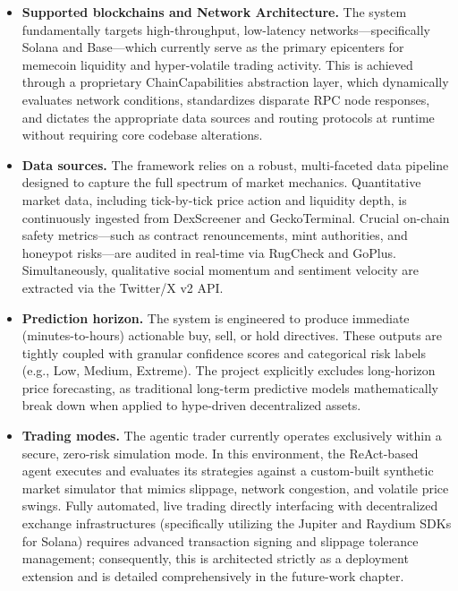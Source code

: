 \documentclass[12pt,a4paper,oneside,openany]{book}
\begin{document}
\begin{itemize}[leftmargin=8mm]
\item \textbf{Supported blockchains and Network Architecture.} The system fundamentally targets high-throughput, low-latency networks—specifically Solana and Base—which currently serve as the primary epicenters for memecoin liquidity and hyper-volatile trading activity. This is achieved through a proprietary ChainCapabilities abstraction layer, which dynamically evaluates network conditions, standardizes disparate RPC node responses, and dictates the appropriate data sources and routing protocols at runtime without requiring core codebase alterations.

\item \textbf{Data sources.} The framework relies on a robust, multi-faceted data pipeline designed to capture the full spectrum of market mechanics. Quantitative market data, including tick-by-tick price action and liquidity depth, is continuously ingested from DexScreener and GeckoTerminal. Crucial on-chain safety metrics—such as contract renouncements, mint authorities, and honeypot risks—are audited in real-time via RugCheck and GoPlus. Simultaneously, qualitative social momentum and sentiment velocity are extracted via the Twitter/X v2 API. 

\item \textbf{Prediction horizon.} The system is engineered to produce immediate (minutes-to-hours) actionable buy, sell, or hold directives. These outputs are tightly coupled with granular confidence scores and categorical risk labels (e.g., Low, Medium, Extreme). The project explicitly excludes long-horizon price forecasting, as traditional long-term predictive models mathematically break down when applied to hype-driven decentralized assets.

\item \textbf{Trading modes.} The agentic trader currently operates exclusively within a secure, zero-risk simulation mode. In this environment, the ReAct-based agent executes and evaluates its strategies against a custom-built synthetic market simulator that mimics slippage, network congestion, and volatile price swings. Fully automated, live trading directly interfacing with decentralized exchange infrastructures (specifically utilizing the Jupiter and Raydium SDKs for Solana) requires advanced transaction signing and slippage tolerance management; consequently, this is architected strictly as a deployment extension and is detailed comprehensively in the future-work chapter.


\end{itemize}
\end{document}
